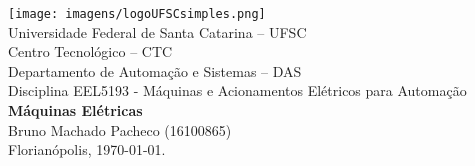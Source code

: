 \documentclass[a4paper,11pt]{article}
\begin{document}
	\thispagestyle{empty}
\begin{center}
	\texttt{[image: imagens/logoUFSCsimples.png]} \\
	{\Large Universidade Federal de Santa Catarina -- UFSC} \\
	{\Large Centro Tecnológico -- CTC} \\
	{\Large Departamento de Automação e Sistemas -- DAS} \\
	\vspace{1cm}
	{\large Disciplina EEL5193 - Máquinas e Acionamentos Elétricos para Automação} \\
	\vfill
	\large{\textbf{Máquinas Elétricas} \\
	} 
	\vspace{1cm}
    Bruno Machado Pacheco (16100865) \\
    \vfill
	Florianópolis, \today.
\end{center}

\clearpage

\tableofcontents

\clearpage



\FloatBarrier
\newpage


\FloatBarrier
\newpage


\FloatBarrier
\newpage


\FloatBarrier
\newpage


\FloatBarrier
\newpage


\newpage
\end{document}
